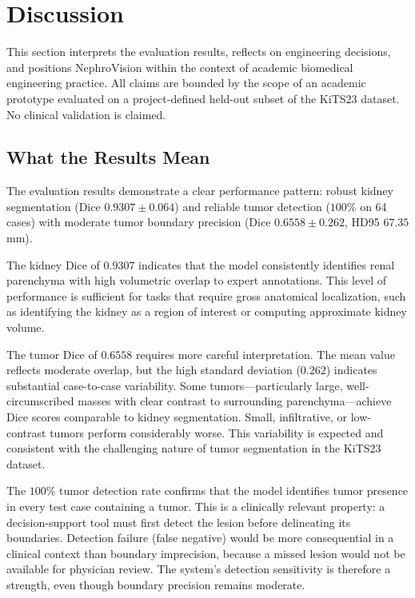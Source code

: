 \section{Discussion}

This section interprets the evaluation results, reflects on engineering decisions, and positions NephroVision within the context of academic biomedical engineering practice. All claims are bounded by the scope of an academic prototype evaluated on a project-defined held-out subset of the KiTS23 dataset. No clinical validation is claimed.

\subsection{What the Results Mean}

The evaluation results demonstrate a clear performance pattern: robust kidney segmentation (Dice $0.9307 \pm 0.064$) and reliable tumor detection ($100\%$ on 64 cases) with moderate tumor boundary precision (Dice $0.6558 \pm 0.262$, HD95 $67.35$ mm).

The kidney Dice of $0.9307$ indicates that the model consistently identifies renal parenchyma with high volumetric overlap to expert annotations. This level of performance is sufficient for tasks that require gross anatomical localization, such as identifying the kidney as a region of interest or computing approximate kidney volume.

The tumor Dice of $0.6558$ requires more careful interpretation. The mean value reflects moderate overlap, but the high standard deviation ($0.262$) indicates substantial case-to-case variability. Some tumors---particularly large, well-circumscribed masses with clear contrast to surrounding parenchyma---achieve Dice scores comparable to kidney segmentation. Small, infiltrative, or low-contrast tumors perform considerably worse. This variability is expected and consistent with the challenging nature of tumor segmentation in the KiTS23 dataset.

The $100\%$ tumor detection rate confirms that the model identifies tumor presence in every test case containing a tumor. This is a clinically relevant property: a decision-support tool must first detect the lesion before delineating its boundaries. Detection failure (false negative) would be more consequential in a clinical context than boundary imprecision, because a missed lesion would not be available for physician review. The system's detection sensitivity is therefore a strength, even though boundary precision remains moderate.

